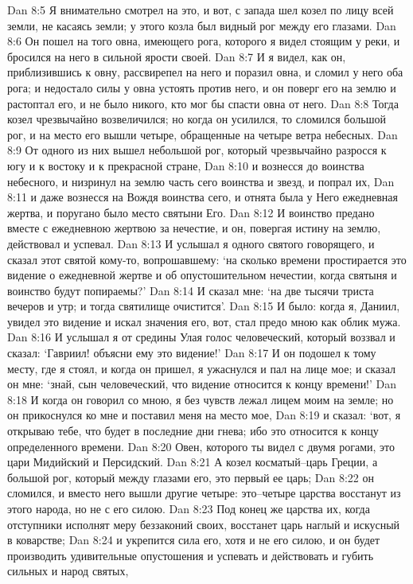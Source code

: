Dan 8:5  Я внимательно смотрел на это, и вот, с запада шел козел по лицу всей земли, не касаясь земли; у этого козла был видный рог между его глазами.
Dan 8:6  Он пошел на того овна, имеющего рога, которого я видел стоящим у реки, и бросился на него в сильной ярости своей.
Dan 8:7  И я видел, как он, приблизившись к овну, рассвирепел на него и поразил овна, и сломил у него оба рога; и недостало силы у овна устоять против него, и он поверг его на землю и растоптал его, и не было никого, кто мог бы спасти овна от него.
Dan 8:8  Тогда козел чрезвычайно возвеличился; но когда он усилился, то сломился большой рог, и на место его вышли четыре, обращенные на четыре ветра небесных.
Dan 8:9  От одного из них вышел небольшой рог, который чрезвычайно разросся к югу и к востоку и к прекрасной стране,
Dan 8:10  и вознесся до воинства небесного, и низринул на землю часть сего воинства и звезд, и попрал их,
Dan 8:11  и даже вознесся на Вождя воинства сего, и отнята была у Него ежедневная жертва, и поругано было место святыни Его.
Dan 8:12  И воинство предано вместе с ежедневною жертвою за нечестие, и он, повергая истину на землю, действовал и успевал.
Dan 8:13  И услышал я одного святого говорящего, и сказал этот святой кому-то, вопрошавшему: `на сколько времени простирается это видение о ежедневной жертве и об опустошительном нечестии, когда святыня и воинство будут попираемы?'
Dan 8:14  И сказал мне: `на две тысячи триста вечеров и утр; и тогда святилище очистится'.
Dan 8:15  И было: когда я, Даниил, увидел это видение и искал значения его, вот, стал предо мною как облик мужа.
Dan 8:16  И услышал я от средины Улая голос человеческий, который воззвал и сказал: `Гавриил! объясни ему это видение!'
Dan 8:17  И он подошел к тому месту, где я стоял, и когда он пришел, я ужаснулся и пал на лице мое; и сказал он мне: `знай, сын человеческий, что видение относится к концу времени!'
Dan 8:18  И когда он говорил со мною, я без чувств лежал лицем моим на земле; но он прикоснулся ко мне и поставил меня на место мое,
Dan 8:19  и сказал: `вот, я открываю тебе, что будет в последние дни гнева; ибо это относится к концу определенного времени.
Dan 8:20  Овен, которого ты видел с двумя рогами, это цари Мидийский и Персидский.
Dan 8:21  А козел косматый--царь Греции, а большой рог, который между глазами его, это первый ее царь;
Dan 8:22  он сломился, и вместо него вышли другие четыре: это--четыре царства восстанут из этого народа, но не с его силою.
Dan 8:23  Под конец же царства их, когда отступники исполнят меру беззаконий своих, восстанет царь наглый и искусный в коварстве;
Dan 8:24  и укрепится сила его, хотя и не его силою, и он будет производить удивительные опустошения и успевать и действовать и губить сильных и народ святых,
